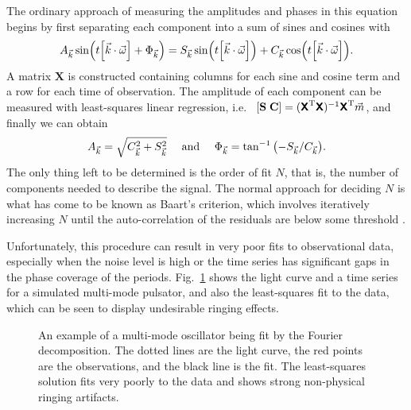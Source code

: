 \documentclass[11pt,twoside]{book}
\begin{document}
The ordinary approach of measuring the amplitudes and phases in this equation begins by first separating each component into a sum of sines and cosines with
\begin{equation} \label{eq:varsep}
    A_{\vec k} \sin(t\qty[\vec k\cdot \vec \omega] + \Phi_{\vec k}) = S_{\vec k} \sin(t\qty[\vec k\cdot \vec \omega]) + C_{\vec k} \cos(t\qty[\vec k\cdot \vec \omega]).
\end{equation}
A matrix $\mathbf{X}$ is constructed containing columns for each sine and cosine term and a row for each time of observation. The amplitude of each component can be measured with least-squares linear regression, i.e.~ $\qty[\mathbf{S}\; \mathbf{C}] = (\textsf{\textbf{X}}^\text{T} \textsf{\textbf{X}})^{-1} \textsf{\textbf{X}}^\text{T} \vec{m}$, and finally we can obtain
\begin{equation}
    A_{\vec{k}} = \sqrt{C_{\vec{k}}^2 + S_{\vec{k}}^2} \quad \text{ and } \quad \Phi_{\vec{k}} = \tan^{-1} \qty(-S_{\vec{k}} / C_{\vec{k}}).
\end{equation}
The only thing left to be determined is the order of fit $N$, that is, the number of components needed to describe the signal. The normal approach for deciding $N$ is what has come to be known as Baart's criterion, which involves iteratively increasing $N$ until the auto-correlation of the residuals are below some threshold \citep{baart1982use, petersen1986studies}. 

Unfortunately, this procedure can result in very poor fits to observational data, especially when the noise level is high or the time series has significant gaps in the phase coverage of the periods. Fig.~\ref{fig:badfit} shows the light curve and a time series for a simulated multi-mode pulsator, and also the least-squares fit to the data, which can be seen to display undesirable ringing effects. 

\begin{figure}
    \centering
    
    \caption{An example of a multi-mode oscillator being fit by the Fourier decomposition. The dotted lines are the light curve, the red points are the observations, and the black line is the fit. The least-squares solution fits very poorly to the data and shows strong non-physical ringing artifacts.} 
    \label{fig:badfit} 
\end{figure} 

\end{document}
